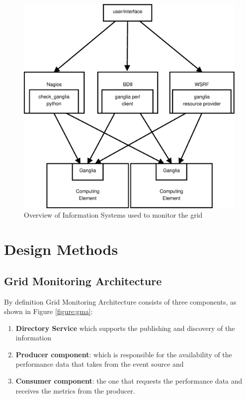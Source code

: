 \begin{figure}[htb]
\centering
 \includegraphics[width=130mm]{images/is.eps}
\caption{Overview of Information Systems used to monitor the grid}
\label{figure:is}
\end{figure}

\section{Design Methods}

\subsection{Grid Monitoring Architecture}

By definition \cite{Taylor2006} Grid Monitoring Architecture consists of three components, as shown in Figure \ref{figure:gma}:

\begin{enumerate}
\item {\bf Directory Service} which supports the publishing and discovery of the information
\item {\bf Producer component}: which is responsible for the availability of the performance data that takes from the event source and
\item {\bf Consumer component}: the one that requests the performance data and receives the metrics from the producer.
\end{enumerate}

